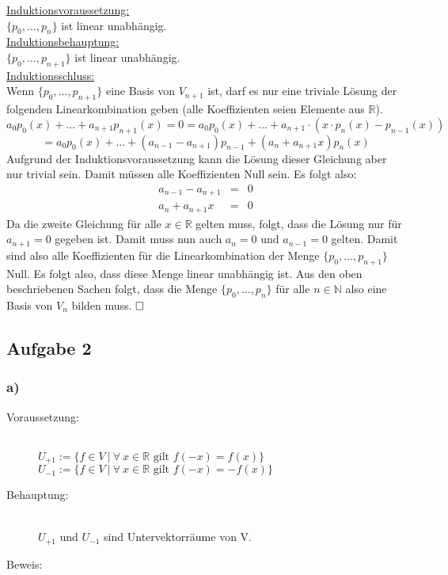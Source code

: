 \documentclass[10pt, a4paper]{article}
\begin{document}
		\underline{Induktionsvoraussetzung:}\\
		$\{p_0,...,p_n\}$ ist linear unabhängig.\\

		\underline{Induktionsbehauptung:}\\
		$\{p_0,...,p_{n+1}\}$ ist linear unabhängig.\\

		\underline{Induktionsschluss:}\\
		Wenn $\{p_0,...,p_{n+1}\}$ eine Basis von $V_{n+1}$ ist, darf es nur eine triviale Lösung der folgenden Linearkombination geben (alle Koeffizienten seien Elemente aus $\mathbb{R}$).
		\[
			 	a_0p_0(x) + ... + a_{n+1}p_{n+1}(x) = 0 = a_0p_0(x) + ... + a_{n+1}\cdot\left( x\cdot p_n(x) - p_{n-1}(x) \right)
		\] 
		\[
			= a_0p_0(x) + ... + (a_{n-1}-a_{n+1})p_{n-1} + (a_n + a_{n+1}x)p_n(x)
		\]
		Aufgrund der Induktionsvoraussetzung kann die Lösung dieser Gleichung aber nur trivial sein. Damit müssen alle Koeffizienten Null sein. Es folgt also:
		\begin{eqnarray*}
			a_{n-1}-a_{n+1} &=& 0\\
			a_n + a_{n+1}x &=& 0
		\end{eqnarray*}
		Da die zweite Gleichung für alle $x \in \mathbb{R}$ gelten muss, folgt, dass die Lösung nur für $a_{n+1} = 0$ gegeben ist. Damit muss nun auch $a_n = 0$ und $a_{n-1} = 0$ gelten.
		Damit sind also alle Koeffizienten für die Linearkombination der Menge $\{p_0,...,p_{n+1}\}$ Null. Es folgt also, dass diese Menge linear unabhängig ist. Aus den oben beschriebenen Sachen folgt, dass die Menge $\{p_0,...,p_{n}\}$ für alle $n \in \mathbb{N}$ also eine Basis von $V_n$ bilden muss. $\hfill\Box$
		 


	\newpage

	\subsection*{Aufgabe 2} %
	\label{sub:aufgabe_2}
	
	\subsubsection*{a)} %
	\label{ssub:a_}

		\begin{description}
			\item[Voraussetzung:] \hfill \\
				$U_{+1} := \{f \in V \ | \ \forall \ x \in \mathbb{R} \text{ gilt } f(-x) = f(x)\}$ \\
				$U_{-1} := \{f \in V \ | \ \forall \ x \in \mathbb{R} \text{ gilt } f(-x) = -f(x)\}$				
			\item[Behauptung:] \hfill \\
				$U_{+1}$ und $U_{-1}$ sind Untervektorräume von V.
			\item[Beweis:]
		\end{description}
		
\end{document}
